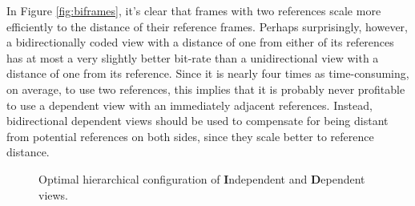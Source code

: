 \documentclass{sig-alternate-05-2015}
\begin{document}
In Figure \ref{fig:biframes}, it's clear that frames with two references scale
more efficiently to the distance of their reference frames. Perhaps
surprisingly, however, a bidirectionally coded view with a distance of one from
either of its references has at most a very slightly better bit-rate than a
unidirectional view with a distance of one from its reference. Since it is
nearly four times as time-consuming, on average, to use two references, this
implies that it is probably never profitable to use a dependent view with an
immediately adjacent references. Instead, bidirectional dependent views should
be used to compensate for being distant from potential references on both sides,
since they scale better to reference distance.

\begin{figure}[H]
\begin{center}
\end{center}
\caption{
Optimal hierarchical configuration of \textbf{I}ndependent and
\textbf{D}ependent views.
}
\label{fig:hierarchical}
\end{figure}
\end{document}
